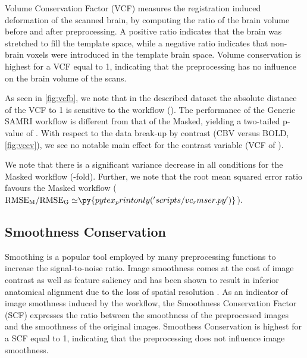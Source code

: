 Volume Conservation Factor (VCF) measures the registration induced deformation of the scanned brain, by computing the ratio of the brain volume before and after preprocessing.
A positive ratio indicates that the brain was stretched to fill the template space, while a negative ratio indicates that non-brain voxels were introduced in the template brain space.
Volume conservation is highest for a VCF equal to 1, indicating that the preprocessing has no influence on the brain volume of the scans.

As seen in \cref{fig:vcfb}, we note that in the described dataset the absolute distance of the VCF to 1 is sensitive to the workflow
().
The performance of the Generic SAMRI workflow is different from that of the Masked, yielding a two-tailed p-value of .
With respect to the data break-up by contrast (CBV versus BOLD, \cref{fig:vccv}), we see no notable main effect for the contrast variable
(VCF of ).

We note that there is a significant variance decrease in all conditions for the Masked workflow
(-fold).
Further, we note that the root mean squared error ratio favours the Masked workflow
($\mathrm{RMSE_{M}/RMSE_{G}\simeq} \py{pytex_printonly('scripts/vc_rmser.py')}$).

\subsection{Smoothness Conservation}


Smoothing is a popular tool employed by many preprocessing functions to increase the signal-to-noise ratio.
Image smoothness comes at the cost of image contrast as well as feature saliency and has been shown to result in inferior anatomical alignment due to the loss of spatial resolution \citep{fmriprep}.
As an indicator of image smothness induced by the workflow, the Smoothness Conservation Factor (SCF) expresses the ratio between the smoothness of the preprocessed images and the smoothness of the original images.
Smoothess Conservation is highest for a SCF equal to 1, indicating that the preprocessing does not influence image smoothness.

